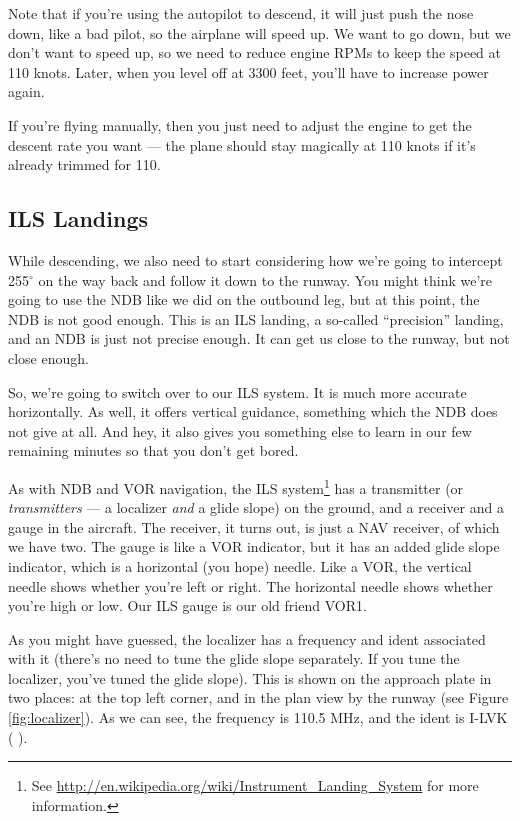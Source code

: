 Note that if you're using the autopilot to descend, it will just push
the nose down, like a bad pilot, so the airplane will speed up.  We
want to go down, but we don't want to speed up, so we need to reduce
engine RPMs to keep the speed at 110 knots.  Later, when you level off
at 3300 feet, you'll have to increase power again.

If you're flying manually, then you just need to adjust the engine to
get the descent rate you want --- the plane should stay magically at
110 knots if it's already trimmed for 110.

\subsection{ILS Landings}

While descending, we also need to start considering how we're going to
intercept 255$^\circ$ on the way back and follow it down to the
runway.  You might think we're going to use the NDB like we did on the
outbound leg, but at this point, the NDB is not good enough.  This is
an ILS landing, a so-called ``precision'' landing, and an NDB is just
not precise enough.  It can get us close to the runway, but not close
enough.

So, we're going to switch over to our ILS system.  It is much more
accurate horizontally.  As well, it offers vertical guidance,
something which the NDB does not give at all.  And hey, it also gives
you something else to learn in our few remaining minutes so that you
don't get bored.

As with NDB and VOR navigation, the ILS system\footnote{See
  \url{http://en.wikipedia.org/wiki/Instrument_Landing_System} for
  more information.} has a transmitter (or \emph{transmitters} --- a
localizer \emph{and} a glide slope) on the ground, and a receiver and
a gauge in the aircraft.  The receiver, it turns out, is just a NAV
receiver, of which we have two.  The gauge is like a VOR indicator,
but it has an added glide slope indicator, which is a horizontal (you
hope) needle.  Like a VOR, the vertical needle shows whether you're
left or right.  The horizontal needle shows whether you're high or
low.  Our ILS gauge is our old friend VOR1.

As you might have guessed, the localizer has a frequency and ident
associated with it (there's no need to tune the glide slope
separately.  If you tune the localizer, you've tuned the glide slope).
This is shown on the approach plate in two places: at the top left
corner, and in the plan view by the runway (see Figure
\ref{fig:localizer}).  As we can see, the frequency is 110.5 MHz, and
the ident is I-LVK (\mdot\mdot\mspace \mdot\mdash\mdot\mdot\mspace
\mdot\mdot\mdot\mdash\mspace \mdash\mdot\mdash).

